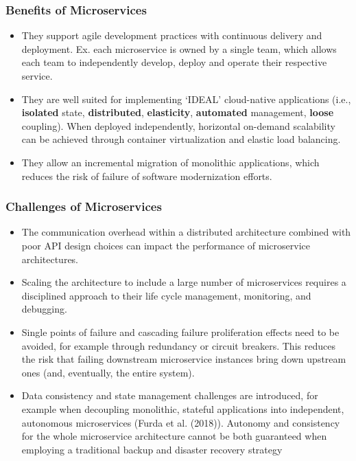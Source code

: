 \subsubsection{Benefits of Microservices}
\begin{itemize}
  \item They support agile development practices with continuous delivery and deployment. Ex. each microservice is owned by a single team, which allows each team to independently develop, deploy and operate their respective service.
  \item They are well suited for implementing ‘IDEAL’ cloud-native applications (i.e., \textbf{isolated} state, \textbf{distributed}, \textbf{elasticity}, \textbf{automated} management, \textbf{loose} coupling). When deployed independently, horizontal on-demand scalability can be achieved through container virtualization and elastic load balancing.
  \item They allow an incremental migration of monolithic applications, which reduces the risk of failure of software modernization efforts.
\end{itemize}

\subsubsection{Challenges of Microservices}
\begin{itemize}
  \item The communication overhead within a distributed architecture combined with poor API design choices can impact the performance of microservice architectures.
  \item Scaling the architecture to include a large number of microservices requires a disciplined approach to their life cycle management, monitoring, and debugging.
  \item Single points of failure and cascading failure proliferation effects need to be avoided, for example through redundancy or circuit breakers. This reduces the risk that failing downstream microservice instances bring down upstream ones (and, eventually, the entire system).
  \item Data consistency and state management challenges are introduced, for example when decoupling monolithic, stateful applications into independent, autonomous microservices (Furda et al. (2018)).
        Autonomy and consistency for the whole microservice architecture cannot be both guaranteed when employing a traditional backup and disaster recovery strategy
\end{itemize}

